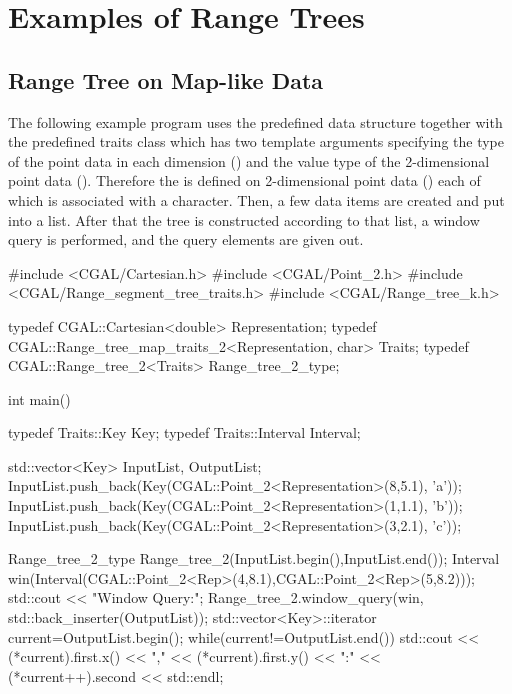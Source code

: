 \section{Examples of Range Trees\label{User:RangeSegment:User:Range}}
\subsection{Range Tree on Map-like Data}

The following example program uses the predefined  data structure together with the predefined traits
  class  which has two template
  arguments specifying the
  type of the point data in each dimension
  () and the value type of the
  2-dimensional point data (). Therefore the  is defined on 2-dimensional point data
  () each of which is
  associated with a character.
Then, a few data items are created and put into a list. After
  that the tree is constructed according to that list, a window
  query is performed, and the query elements are given out.

\begin{cprog}

#include <CGAL/Cartesian.h>
#include <CGAL/Point_2.h>
#include <CGAL/Range_segment_tree_traits.h>
#include <CGAL/Range_tree_k.h>

typedef CGAL::Cartesian<double> Representation;
typedef CGAL::Range_tree_map_traits_2<Representation, char> Traits;
typedef CGAL::Range_tree_2<Traits> Range_tree_2_type;

int main()
{
  typedef Traits::Key Key;                
  typedef Traits::Interval Interval;    

  std::vector<Key> InputList, OutputList;
  InputList.push_back(Key(CGAL::Point_2<Representation>(8,5.1), 'a'));
  InputList.push_back(Key(CGAL::Point_2<Representation>(1,1.1), 'b'));
  InputList.push_back(Key(CGAL::Point_2<Representation>(3,2.1), 'c'));

  Range_tree_2_type Range_tree_2(InputList.begin(),InputList.end());
  Interval win(Interval(CGAL::Point_2<Rep>(4,8.1),CGAL::Point_2<Rep>(5,8.2)));
  std::cout << "\n Window Query:\n ";
  Range_tree_2.window_query(win, std::back_inserter(OutputList));
  std::vector<Key>::iterator current=OutputList.begin();
  while(current!=OutputList.end()){
    std::cout << (*current).first.x() << "," << (*current).first.y()
         << ":" << (*current++).second << std::endl;
  }
}
\end{cprog}



